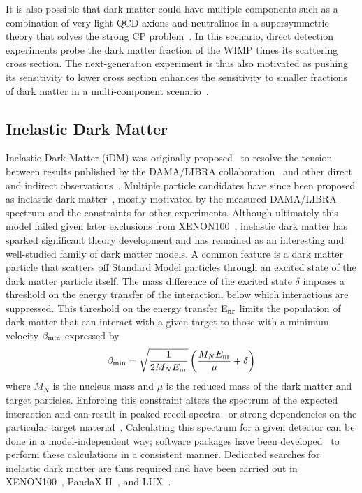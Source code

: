 It is also possible that dark matter could have multiple components such as a combination of very light QCD axions and neutralinos in a supersymmetric theory that solves the strong CP problem~\cite{Baer:2011hx}. In this scenario, direct detection experiments probe the dark matter fraction of the WIMP times its scattering cross section. The next-generation experiment is thus also motivated as pushing its sensitivity to lower cross section enhances the sensitivity to smaller fractions of dark matter in a multi-component scenario~\cite{Zurek:2008qg,Profumo:2009tb,Kajiyama:2013rla,Herrero-Garcia:2017vrl,Herrero-Garcia:2018qnz,Scaffidi:2020wpa}.

\subsection{Inelastic Dark Matter}\label{sec:inelasticdarkmatter}

Inelastic Dark Matter (iDM) was originally proposed~\cite{TuckerSmith:2001hy} to resolve the tension between results published by the DAMA/LIBRA collaboration~\cite{Bernabei:2008yh,Bernabei:2010mq,Bernabei:2018yyw} and other direct and indirect observations~\cite{Ullio:2000bv,TuckerSmith:2004jv,Chang:2008gd}. Multiple particle candidates have since been proposed as inelastic dark matter~\cite{ArkaniHamed:2008qn,Cui:2009xq}, mostly motivated by the measured DAMA/LIBRA spectrum and the constraints for other experiments. Although ultimately this model failed given later exclusions from XENON100~\cite{Aprile:2011ts}, inelastic dark matter has sparked significant theory development and has remained as an interesting and well-studied family of dark matter models. A common feature is a dark matter particle that scatters off Standard Model particles through an excited state of the dark matter particle itself. The mass difference of the excited state $\delta$ imposes a threshold on the energy transfer of the interaction, below which interactions are suppressed. This threshold on the energy transfer E$_{\rm nr}$ limits the population of dark matter that can interact with a given target to those with a minimum velocity $\beta_{\rm min}$ expressed by
\begin{equation}
      \beta_{\rm min} = \sqrt{\frac{1}{2M_N E_{\rm nr}}} \left(\frac{M_N E_{\rm nr}}{\mu} + \delta\right)  
\end{equation}
where $M_N$ is the nucleus mass and $\mu$ is the reduced mass of the dark matter and target particles. Enforcing this constraint alters the spectrum of the expected interaction and can result in peaked recoil spectra~\cite{TuckerSmith:2001hy,Lang:2010cd} or strong dependencies on the particular target material~\cite{Chang:2010pr}. Calculating this spectrum for a given detector can be done in a model-independent way; software packages have been developed~\cite{Barello:2014uda} to perform these calculations in a consistent manner. Dedicated searches for inelastic dark matter are thus required and have been carried out in XENON100~\cite{Aprile:2017aas}, PandaX-II~\cite{Chen:2017prd}, and LUX~\cite{LUX:2021ksq}.

